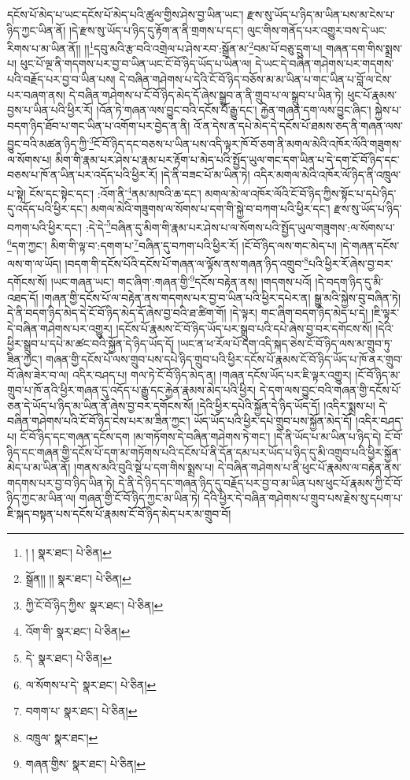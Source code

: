 དངོས་པོ་མེད་པ་ཡང་དངོས་པོ་མེད་པའི་ཚུལ་གྱིས་ཤེས་བྱ་ཡིན་ཡང་། རྫས་སུ་ཡོད་པ་ཉིད་མ་ཡིན་པས་མ་ངེས་པ་ཉིད་ཀྱང་ཡིན་ནོ། །དེ་རྫས་སུ་ཡོད་པ་ཉིད་དུ་རྟོག་ན་ནི་གྲགས་པ་དང་། ལུང་གིས་གནོད་པར་འགྱུར་བས་དེ་ཡང་རིགས་པ་མ་ཡིན་ནོ།། །།\footnote{། །  སྣར་ཐང་།  པེ་ཅིན། }དབུ་མའི་རྩ་བའི་འགྲེལ་པ་ཤེས་རབ་:སྒྲོན་མ་\footnote{སྒྲོན།། །།  སྣར་ཐང་།  པེ་ཅིན། }བམ་པོ་བཅུ་དྲུག་པ། གཞན་དག་གིས་སྨྲས་པ། ཕུང་པོ་ལྔ་ནི་གདགས་པར་བྱ་བ་ཡིན་ཡང་ངོ་བོ་ཉིད་ཡོད་པ་ཡིན་ལ། དེ་ཡང་དེ་བཞིན་གཤེགས་པར་གདགས་པའི་བརྗོད་པར་བྱ་བ་ཡིན་པས། དེ་བཞིན་གཤེགས་པ་དེའི་ངོ་བོ་ཉིད་བཅོས་མ་མ་ཡིན་པ་གང་ཡིན་པ་བློ་ལ་ངེས་པར་བཞག་ནས། དེ་བཞིན་གཤེགས་པ་ངོ་བོ་ཉིད་མེད་དོ་ཞེས་སྒྲུབ་ན་ནི་གྲུབ་པ་ལ་སྒྲུབ་པ་ཡིན་ཏེ། ཕུང་པོ་རྣམས་བྱས་པ་ཡིན་པའི་ཕྱིར་རོ། །འོན་ཏེ་གཞན་ལས་བྱུང་བའི་དངོས་པོ་རྒྱུ་དང་། རྐྱེན་གཞན་དག་ལས་བྱུང་ཞིང་། སྐྱེས་པ་བདག་ཉིད་ཐོབ་པ་གང་ཡིན་པ་འགོག་པར་བྱེད་ན་ནི། འོ་ན་དེས་ན་དཔེ་མེད་དེ་དངོས་པོ་ཐམས་ཅད་ནི་གཞན་ལས་བྱུང་བའི་མཚན་ཉིད་ཀྱི་\footnote{ཀྱི་ངོ་བོ་ཉིད་ཀྱིས་  སྣར་ཐང་།  པེ་ཅིན། }ངོ་བོ་ཉིད་དང་བཅས་པ་ཡིན་པས་འདི་ལྟར་ཁོ་བོ་ཅག་ནི་མགལ་མེའི་འཁོར་ལོའི་གཟུགས་ལ་སོགས་པ། མིག་གི་རྣམ་པར་ཤེས་པ་རྣམ་པར་རྟོག་པ་མེད་པའི་སྤྱོད་ཡུལ་གང་དག་ཡིན་པ་དེ་དག་ངོ་བོ་ཉིད་དང་བཅས་པ་ཁོ་ན་ཡིན་པར་འདོད་པའི་ཕྱིར་རོ། །དེ་ནི་བཟང་པོ་མ་ཡིན་ཏེ། འདིར་མགལ་མེའི་འཁོར་ལོ་ཉིད་ནི་འཁྲུལ་པ་སྟེ། ངོས་དང་སྟེང་དང་། :འོག་ནི་\footnote{འོག་གི་  སྣར་ཐང་།  པེ་ཅིན། }ནམ་མཁའི་ཆ་དང་། མགལ་མེ་ལ་འཁོར་ལོའི་ངོ་བོ་ཉིད་ཀྱིས་སྟོང་པ་དཔེ་ཉིད་དུ་འདོད་པའི་ཕྱིར་དང་། མགལ་མེའི་གཟུགས་ལ་སོགས་པ་དག་གི་སྐྱེ་བ་བཀག་པའི་ཕྱིར་དང་། རྫས་སུ་ཡོད་པ་ཉིད་བཀག་པའི་ཕྱིར་དང་། :དེ་དེ་\footnote{དེ་  སྣར་ཐང་།  པེ་ཅིན། }བཞིན་དུ་མིག་གི་རྣམ་པར་ཤེས་པ་ལ་སོགས་པའི་སྤྱོད་ཡུལ་གཟུགས་:ལ་སོགས་པ་\footnote{ལ་སོགས་པ་དེ་  སྣར་ཐང་།  པེ་ཅིན། }དག་ཀྱང་། མིག་གི་ལྟ་བ་:དགག་པ་\footnote{བགག་པ་  སྣར་ཐང་།  པེ་ཅིན། }བཞིན་དུ་བཀག་པའི་ཕྱིར་རོ། །ངོ་བོ་ཉིད་ལས་གང་མེད་པ། །དེ་གཞན་དངོས་ལས་ག་ལ་ཡོད། །བདག་གི་དངོས་པོའི་དངོས་པོ་གཞན་ལ་ལྟོས་ནས་གཞན་ཉིད་འགྲུབ་\footnote{འཁྲུལ་  སྣར་ཐང་། }པའི་ཕྱིར་རོ་ཞེས་བྱ་བར་དགོངས་སོ། །ཡང་གཞན་ཡང་། གང་ཞིག་:གཞན་གྱི་\footnote{གཞན་གྱིས་  སྣར་ཐང་།  པེ་ཅིན། }དངོས་བརྟེན་ནས། །གདགས་པའོ། །དེ་བདག་ཉིད་དུ་མི་འཐད་དོ། །གཞན་གྱི་དངོས་པོ་ལ་བརྟེན་ནས་གདགས་པར་བྱ་བ་ཡིན་པའི་ཕྱིར་དཔེར་ན། སྒྱུ་མའི་སྐྱེས་བུ་བཞིན་ཏེ། དེ་ནི་བདག་ཉིད་མེད་དེ་ངོ་བོ་ཉིད་མེད་དོ་ཞེས་བྱ་བའི་ཐ་ཚིག་གོ། །དེ་ལྟར། གང་ཞིག་བདག་ཉིད་མེད་པ་དེ། །ཇི་ལྟར་དེ་བཞིན་གཤེགས་པར་འགྱུར། །དངོས་པོ་རྣམས་ངོ་བོ་ཉིད་ཡོད་པར་སྒྲུབ་པའི་དཔེ་ཞེས་བྱ་བར་དགོངས་སོ། །དེའི་ཕྱིར་སྒྲུབ་པ་དཔེ་མ་ཚང་བའི་སྐྱོན་དེ་ཉིད་ཡོད་དོ། །ཡང་ན་ཕ་རོལ་པོ་དག་འདི་སྐད་ཅེས་ངོ་བོ་ཉིད་ལས་མ་གྲུབ་ཏུ་ཟིན་ཀྱང་། གཞན་གྱི་དངོས་པོ་ལས་གྲུབ་པས་དཔེ་ཉིད་གྲུབ་པའི་ཕྱིར་དངོས་པོ་རྣམས་ངོ་བོ་ཉིད་ཡོད་པ་ཁོ་ནར་གྲུབ་བོ་ཞེས་ཟེར་བ་ལ། འདིར་བཤད་པ། གལ་ཏེ་ངོ་བོ་ཉིད་མེད་ན། །གཞན་དངོས་ཡོད་པར་ཇི་ལྟར་འགྱུར། །ངོ་བོ་ཉིད་མ་གྲུབ་པ་ཁོ་ནའི་ཕྱིར་གཞན་དུ་འདོད་པ་རྒྱུ་དང་རྐྱེན་རྣམས་མེད་པའི་ཕྱིར། དེ་དག་ལས་བྱུང་བའི་གཞན་གྱི་དངོས་པོ་ཅན་དེ་ཡོད་པ་ཉིད་མ་ཡིན་ནོ་ཞེས་བྱ་བར་དགོངས་སོ། །དེའི་ཕྱིར་དཔེའི་སྐྱོན་དེ་ཉིད་ཡོད་དོ། །འདིར་སྨྲས་པ། དེ་བཞིན་གཤེགས་པའི་ངོ་བོ་ཉིད་ངེས་པར་མ་ཟིན་ཀྱང་། ཡོད་ཡོད་པའི་ཕྱིར་དཔེ་གྲུབ་པས་སྐྱོན་མེད་དོ། །འདིར་བཤད་པ། ངོ་བོ་ཉིད་དང་གཞན་དངོས་དག །མ་གཏོགས་དེ་བཞིན་གཤེགས་ཏེ་གང་། །དེ་ནི་ཡོད་པ་མ་ཡིན་པ་ཉིད་དེ། ངོ་བོ་ཉིད་དང་གཞན་གྱི་དངོས་པོ་དག་མ་གཏོགས་པའི་དངོས་པོ་ནི་དོན་དམ་པར་ཡོད་པ་ཉིད་དུ་མི་འགྲུབ་པའི་ཕྱིར་སྐྱོན་མེད་པ་མ་ཡིན་ནོ། །གནས་མའི་བུའི་སྡེ་པ་དག་གིས་སྨྲས་པ། དེ་བཞིན་གཤེགས་པ་ནི་ཕུང་པོ་རྣམས་ལ་བརྟེན་ནས་གདགས་པར་བྱ་བ་ཉིད་ཡིན་ཏེ། དེ་ནི་དེ་ཉིད་དང་གཞན་ཉིད་དུ་བརྗོད་པར་བྱ་བ་མ་ཡིན་པས་ཕུང་པོ་རྣམས་ཀྱི་ངོ་བོ་ཉིད་ཀྱང་མ་ཡིན་ལ། གཞན་གྱི་ངོ་བོ་ཉིད་ཀྱང་མ་ཡིན་ཏེ། དེའི་ཕྱིར་དེ་བཞིན་གཤེགས་པ་གྲུབ་པས་རྗེས་སུ་དཔག་པ་ཇི་སྐད་བསྟན་པས་དངོས་པོ་རྣམས་ངོ་བོ་ཉིད་མེད་པར་མ་གྲུབ་བོ། 